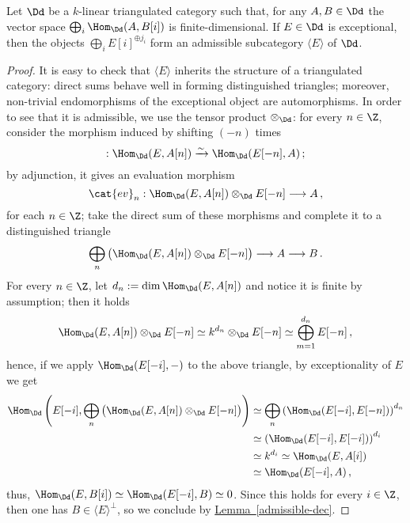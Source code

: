 \begin{lemma}
    Let $\Dd$ be a $k$-linear triangulated category such that,
    for any $A,B \in \Dd$ the vector space 
    $\bigoplus_{i} \Hom_{\Dd}(A,B[i])$ is finite-dimensional.
    If $E \in \Dd$ is exceptional, 
    then the objects $\bigoplus_{i}E[i]^{\oplus j_{i}}$
    form an admissible subcategory $\langle E \rangle$
    of $\Dd$.
    \begin{proof}
        It is easy to check that $\langle E \rangle$ inherits
        the structure of a triangulated category:
        direct sums behave well in forming distinguished triangles;
        moreover, non-trivial endomorphisms of the exceptional
        object are automorphisms.
        In order to see that it is admissible, 
        we use the tensor product $\otimes_{\Dd}$:
        for every $n \in \Z$, consider the morphism
        induced by shifting $(-n)$ times
        \begin{equation*}
           [-n] : \Hom_{\Dd}(E,A[n]) \xrightarrow[]{\sim} \Hom_{\Dd}(E[-n],A)\,;
        \end{equation*}
        by adjunction, it gives an evaluation morphism
        \begin{equation*}
            \cat{ev}_{n} : \Hom_{\Dd}(E,A[n]) \otimes_{\Dd} E[-n] \longrightarrow A\,,
        \end{equation*}
        for each $n \in \Z$; take the direct sum of these morphisms
        and complete it to a distinguished triangle
        \begin{equation*}
            \bigoplus_{n}\big(\Hom_{\Dd}(E,A[n]) \otimes_{\Dd} E[-n] \big)
            \longrightarrow A \longrightarrow B\,.
        \end{equation*}
        For every $n \in \Z$, let $d_{n}:=\dim \Hom_{\Dd}(E,A[n])$ and notice
        it is finite by assumption; then it holds
        \begin{equation*}
            \Hom_{\Dd}(E,A[n]) \otimes_{\Dd} E[-n] 
            \simeq k^{d_{n}} \otimes_{\Dd} E[-n]
            \simeq \bigoplus_{m=1}^{d_{n}} E[-n]\,,
        \end{equation*}
        hence, if we apply $\Hom_{\Dd}(E[-i],-)$ to the above triangle,
        by exceptionality of $E$ we get
        \begin{align*}
            \Hom_{\Dd}\left(E[-i], \bigoplus_{n}\big(\Hom_{\Dd}(E,A[n]) \otimes_{\Dd} E[-n] \big) \right)
            &\simeq \bigoplus_{n} \left( \Hom_{\Dd}(E[-i], E[-n]) \right)^{d_{n}} \\ %
            &\simeq \left( \Hom_{\Dd}(E[-i],E[-i]) \right)^{d_{i}} \\
            &\simeq k^{d_{i}} \simeq \Hom_{\Dd}(E,A[i]) \\
            &\simeq \Hom_{\Dd}(E[-i],A)\,,
        \end{align*}
        thus, $\Hom_{\Dd}(E,B[i]) \simeq \Hom_{\Dd}(E[-i],B) \simeq 0$.
        Since this holds for every $i \in \Z$, 
        then one has $B \in \langle E \rangle^{\perp}$,
        so we conclude by \hyperref[admissible-dec]{Lemma~\ref*{admissible-dec}}.
    \end{proof}
\end{lemma}

